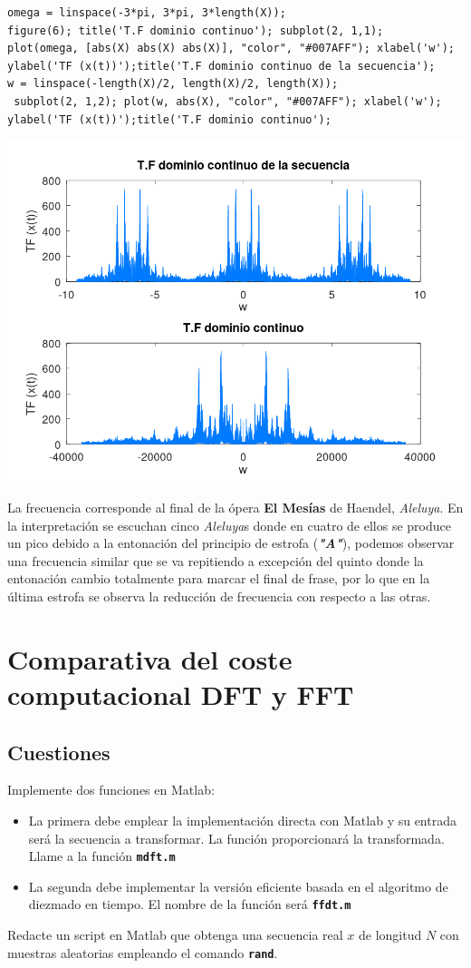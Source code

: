 \documentclass{article}
\newcommand{\code}[1]{\texttt{\textbf{#1}}}
\begin{document}
\begin{itemize}
\begin{lstlisting}
omega = linspace(-3*pi, 3*pi, 3*length(X));
figure(6); title('T.F dominio continuo'); subplot(2, 1,1);
plot(omega, [abs(X) abs(X) abs(X)], "color", "#007AFF"); xlabel('w'); ylabel('TF (x(t))');title('T.F dominio continuo de la secuencia');
w = linspace(-length(X)/2, length(X)/2, length(X));
 subplot(2, 1,2); plot(w, abs(X), "color", "#007AFF"); xlabel('w'); ylabel('TF (x(t))');title('T.F dominio continuo');
\end{lstlisting}

\begin{center}
\includegraphics[width=0.7\linewidth]{Imágenes/Figura6}
\end{center}

La frecuencia corresponde al final de la ópera \textbf{El Mesías} de Haendel, \textit{Aleluya}. En la interpretación se escuchan cinco \textit{Aleluya}s donde en cuatro de ellos se produce un pico debido a la entonación del principio de estrofa (\textbf{\textit{"A"}}), podemos observar una frecuencia similar que se va repitiendo a excepción del quinto donde la entonación cambio totalmente para marcar el final de frase, por lo que en la última estrofa se observa la reducción de frecuencia con respecto a las otras.

\end{itemize}
\section{Comparativa del coste computacional DFT y FFT}
\subsection*{Cuestiones}
Implemente dos funciones en Matlab:
\begin{itemize}
\item La primera debe emplear la implementación directa con Matlab y su entrada será la secuencia a transformar. La función proporcionará la transformada. Llame a la función \code{mdft.m}
\item La segunda debe implementar la versión eficiente basada en el algoritmo de diezmado en tiempo. El nombre de la función será \code{ffdt.m}
\end{itemize}
Redacte un script en Matlab que obtenga una secuencia real $x$ de longitud $N$ con muestras aleatorias empleando el comando \code{rand}.
\end{document}
